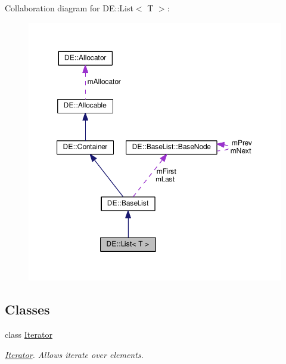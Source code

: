 Collaboration diagram for DE\+:\+:List$<$ T $>$\+:\nopagebreak
\begin{figure}[H]
\begin{center}
\leavevmode
\includegraphics[width=350pt]{classDE_1_1List__coll__graph}
\end{center}
\end{figure}
\subsection*{Classes}
\begin{DoxyCompactItemize}
\item 
class \hyperlink{classDE_1_1List_1_1Iterator}{Iterator}
\begin{DoxyCompactList}\small\item\em \hyperlink{classDE_1_1List_1_1Iterator}{Iterator}. Allows iterate over elements. \end{DoxyCompactList}\end{DoxyCompactItemize}
